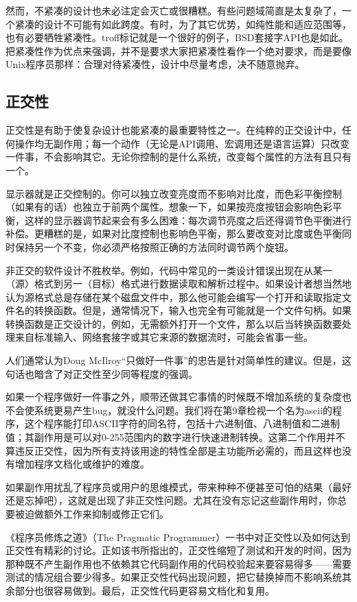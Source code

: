 \documentclass[12pt,oneside]{book}
\begin{document}
\begin{common-format}
然而，不紧凑的设计也未必注定会灭亡或很糟糕。有些问题域简直是太复杂了，一个紧凑的设计不可能有如此跨度。有时，为了其它优势，如纯性能和适应范围等，也有必要牺牲紧凑性。troff标记就是一个很好的例子，BSD套接字API也是如此。把紧凑性作为优点来强调，并不是要求大家把紧凑性看作一个绝对要求，而是要像Unix程序员那样：合理对待紧凑性，设计中尽量考虑，决不随意抛弃。

\subsection{正交性}
正交性是有助于使复杂设计也能紧凑的最重要特性之一。在纯粹的正交设计中，任何操作均无副作用；每一个动作（无论是API调用、宏调用还是语言运算）只改变一件事，不会影响其它。无论你控制的是什么系统，改变每个属性的方法有且只有一个。

显示器就是正交控制的。你可以独立改变亮度而不影响对比度，而色彩平衡控制（如果有的话）也独立于前两个属性。想象一下，如果按亮度按钮会影响色彩平衡，这样的显示器调节起来会有多么困难：每次调节亮度之后还得调节色平衡进行补偿。更糟糕的是，如果对比度控制也影响色平衡，那么要改变对比度或色平衡同时保持另一个不变，你必须严格按照正确的方法同时调节两个旋钮。

非正交的软件设计不胜枚举。例如，代码中常见的一类设计错误出现在从某一（源）格式到另一（目标）格式进行数据读取和解析过程中。如果设计者想当然地认为源格式总是存储在某个磁盘文件中，那么他可能会编写一个打开和读取指定文件名的转换函数。但是，通常情况下，输入也完全有可能就是一个文件句柄。如果转换函数是正交设计的，例如，无需额外打开一个文件，那么以后当转换函数要处理来自标准输入、网络套接字或其它来源的数据流时，可能会省事一些。

人们通常认为Doug McIlroy“只做好一件事”的忠告是针对简单性的建议。但是，这句话也暗含了对正交性至少同等程度的强调。

如果一个程序做好一件事之外，顺带还做其它事情的时候既不增加系统的复杂度也不会使系统更易产生bug，就没什么问题。我们将在第9章检视一个名为ascii的程序，这个程序能打印ASCII字符的同名符，包括十六进制值、八进制值和二进制值；其副作用是可以对0-255范围内的数字进行快速进制转换。这第二个作用并不算违反正交性，因为所有支持该用途的特性全部是主功能所必需的，而且这样也没有增加程序文档化或维护的难度。

如果副作用扰乱了程序员或用户的思维模式，带来种种不便甚至可怕的结果（最好还是忘掉吧），这就是出现了非正交性问题。尤其在没有忘记这些副作用时，你总要被迫做额外工作来抑制或修正它们。

《程序员修炼之道》（The Pragmatic Programmer）\cite{Hunt-Thomas}一书中对正交性以及如何达到正交性有精彩的讨论。正如该书所指出的，正交性缩短了测试和开发的时间，因为那种既不产生副作用也不依赖其它代码副作用的代码校验起来要容易得多——需要测试的情况组合要少得多。如果正交性代码出现问题，把它替换掉而不影响系统其余部分也很容易做到。最后，正交性代码更容易文档化和复用。


\end{common-format}
\end{document}
